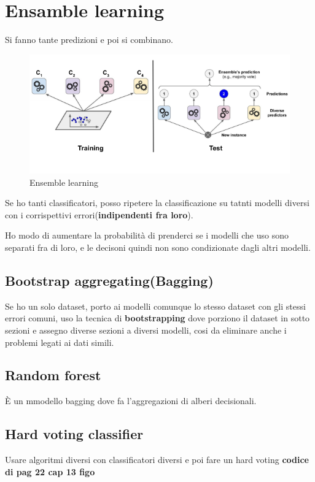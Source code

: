 \section{Ensamble learning}
Si fanno tante predizioni e poi si combinano.

\begin{figure}[H]
    \centering
    \includegraphics[width=0.8\linewidth]{imgs/ensemble-learning}
    \caption{Ensemble learning}
    \label{fig:Ensemble_learning}
\end{figure}

Se ho tanti classificatori, posso ripetere la classificazione su tatnti modelli diversi
con i corrispettivi errori(\textbf{indipendenti fra loro}).

Ho modo di aumentare la probabilità di prenderci se i modelli che uso
sono separati fra di loro, e le decisoni quindi non sono condizionate
dagli altri modelli.

\subsection{Bootstrap aggregating(Bagging)}
Se ho un solo dataset, porto ai modelli comunque lo stesso dataset con gli stessi
errori comuni, uso la tecnica di \textbf{bootstrapping} dove porziono il dataset
in sotto sezioni e assegno diverse sezioni a diversi modelli,
cosi da eliminare anche i problemi legati ai dati simili.

\subsection{Random forest}
È un mmodello bagging dove fa l'aggregazioni di alberi decisionali.

\subsection{Hard voting classifier}
Usare algoritmi diversi con classificatori diversi e poi fare un hard voting
\textbf{codice di pag 22 cap 13 figo}

